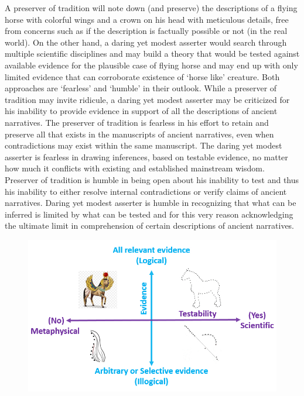 A preserver of tradition will note down (and preserve) the descriptions of a flying horse with colorful wings and a crown on his head with meticulous details, free from concerns such as if the description is factually possible or not (in the real world). On the other hand, a daring yet modest asserter would search through multiple scientific disciplines and may build a theory that would be tested against available evidence for the plausible case of flying horse and may end up with only limited evidence that can corroborate existence of ‘horse like’ creature. Both approaches are ‘fearless’ and ‘humble’ in their outlook. While a preserver of tradition may invite ridicule, a daring yet modest asserter may be criticized for his inability to provide evidence in support of all the descriptions of ancient narratives. The preserver of tradition is fearless in his effort to retain and preserve all that exists in the manuscripts of ancient narratives, even when contradictions may exist within the same manuscript. The daring yet modest asserter is fearless in drawing inferences, based on testable evidence, no matter how much it conflicts with existing and established mainstream wisdom. Preserver of tradition is humble in being open about his inability to test and thus his inability to either resolve internal contradictions or verify claims of ancient narratives. Daring yet modest asserter is humble in recognizing that what can be inferred is limited by what can be tested and for this very reason acknowledging the ultimate limit in comprehension of certain descriptions of ancient narratives.

\setcounter{figure}{1}

\begin{figure}[H]
\includegraphics[scale=.3]{images/chap2-3.jpg}\\
\end{figure}

